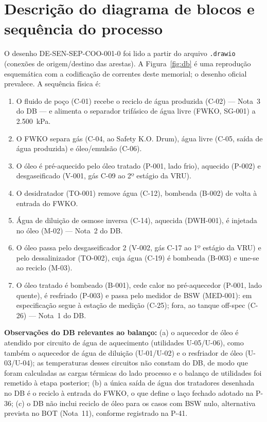 \documentclass[11pt,a4paper]{article}
\numberwithin{equation}{section}
\numberwithin{table}{section}
\numberwithin{figure}{section}
\begin{document}
\section{Descrição do diagrama de blocos e sequência do processo}\label{sec:db}
O desenho DE-SEN-SEP-COO-001-0 foi lido a partir do arquivo \texttt{.drawio} (conexões de origem/destino das arestas). A Figura~\ref{fig:db} é uma reprodução esquemática com a codificação de correntes deste memorial; o desenho oficial prevalece. A sequência física é:
\begin{enumerate}
\item O fluido de poço (C-01) recebe o reciclo de água produzida (C-02) --- Nota~3 do DB --- e alimenta o separador trifásico de água livre (FWKO, SG-001) a 2.500~\si{\kilo\pascal}.
\item O FWKO separa gás (C-04, ao Safety K.O. Drum), água livre (C-05, saída de água produzida) e óleo/emulsão (C-06).
\item O óleo é pré-aquecido pelo óleo tratado (P-001, lado frio), aquecido (P-002) e desgaseificado (V-001, gás C-09 ao 2º estágio da VRU).
\item O desidratador (TO-001) remove água (C-12), bombeada (B-002) de volta à entrada do FWKO.
\item Água de diluição de osmose inversa (C-14), aquecida (DWH-001), é injetada no óleo (M-02) --- Nota~2 do DB.
\item O óleo passa pelo desgaseificador 2 (V-002, gás C-17 ao 1º estágio da VRU) e pelo dessalinizador (TO-002), cuja água (C-19) é bombeada (B-003) e une-se ao reciclo (M-03).
\item O óleo tratado é bombeado (B-001), cede calor no pré-aquecedor (P-001, lado quente), é resfriado (P-003) e passa pelo medidor de BSW (MED-001): em especificação segue à estação de medição (C-25); fora, ao tanque off-spec (C-26) --- Nota~1 do DB.
\end{enumerate}
\textbf{Observações do DB relevantes ao balanço:} (a) o aquecedor de óleo é atendido por circuito de água de aquecimento (utilidades U-05/U-06), como também o aquecedor de água de diluição (U-01/U-02) e o resfriador de óleo (U-03/U-04); as temperaturas desses circuitos não constam do DB, de modo que foram calculadas as cargas térmicas do lado processo e o balanço de utilidades foi remetido à etapa posterior; (b) a única saída de água dos tratadores desenhada no DB é o reciclo à entrada do FWKO, o que define o laço fechado adotado na P-36; (c) o DB não inclui reciclo de óleo para os casos com BSW nulo, alternativa prevista no BOT (Nota~11), conforme registrado na P-41.
\end{document}

